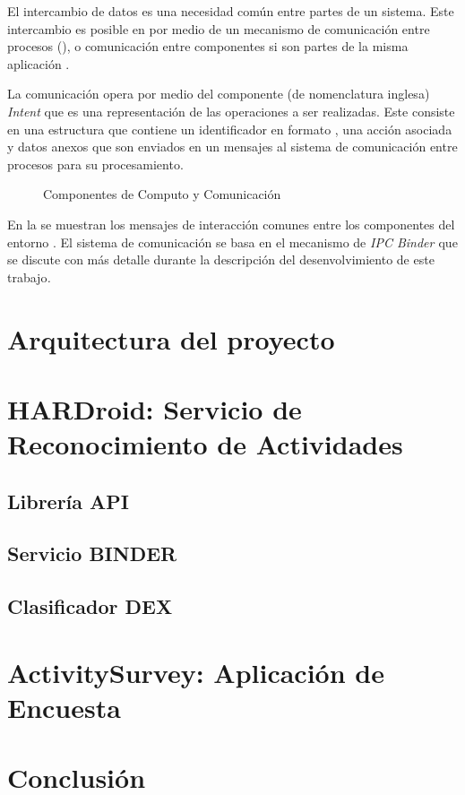 El intercambio de datos es una necesidad común entre partes de un
sistema. Este intercambio es posible en  por medio
de un mecanismo de comunicación entre procesos (), o comunicación
entre componentes si son partes de la misma aplicación \cite{Schreiber2011}. 

La comunicación opera por medio del componente (de nomenclatura inglesa)
\emph{Intent} que es una representación de las operaciones a ser realizadas.
Este consiste en una estructura que contiene un identificador en formato
, una acción asociada y datos anexos que son enviados en
un mensajes al sistema de comunicación entre procesos para su procesamiento. 

\begin{figure}
\caption[Componentes de Computo y Comunicación]{\label{fig5:mensajes-ipc}Componentes de Computo y Comunicación}
\end{figure}

En la  se muestran los mensajes de interacción
comunes entre los componentes del entorno . El sistema
de comunicación se basa en el mecanismo de \emph{IPC Binder \cite{Schreiber2011}}
que se discute con más detalle durante la descripción del desenvolvimiento
de este trabajo\emph{.}

\section{Arquitectura del proyecto}

\label{sec53:arquitectura}

\section{HARDroid: Servicio de Reconocimiento de Actividades}

\label{sec54:hardroid}

\subsection{Librería API}

\subsection{Servicio BINDER}

\subsection{Clasificador DEX}

\section{ActivitySurvey: Aplicación de Encuesta}

\label{sec55:activity}

\section{Conclusión}

\label{sec56:conclusion}

